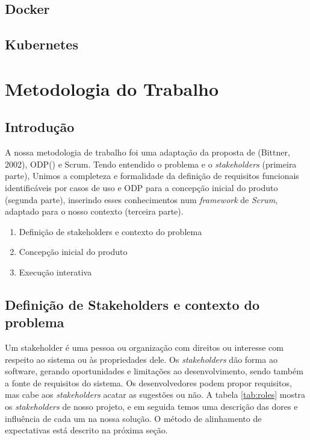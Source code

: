 \documentclass[twosideprint]{politex}
\begin{document}
	\section{Docker}
	\section{Kubernetes}
	

\chapter{Metodologia do Trabalho}
\section{Introdução}
A nossa metodologia de trabalho foi uma adaptação da proposta de (Bittner, 2002)\cite{usecases}, ODP() e Scrum\cite{essentialscrum}. Tendo entendido o problema e o \textit{stakeholders} (primeira parte), Unimos a completeza e formalidade da definição de requisitos funcionais identificáveis por casos de uso e ODP para a concepção inicial do produto (segunda parte), inserindo esses conhecimentos num \textit{framework} de \textit{Scrum}, adaptado para o nosso contexto (terceira parte).
\begin{enumerate}
    \item Definição de stakeholders e contexto do problema
    \item Concepção inicial do produto
    \item Execução interativa
\end{enumerate}

\section{Definição de Stakeholders e contexto do problema}
Um stakeholder é uma pessoa ou organização com direitos ou interesse com respeito ao sistema ou às propriedades dele. Os \textit{stakeholders} dão forma ao software, gerando oportunidades e limitações ao desenvolvimento, sendo também a fonte de requisitos do sistema. Os desenvolvedores podem propor requisitos, mas cabe aos \textit{stakeholders} acatar as sugestões ou não.
A tabela \ref{tab:roles} mostra os \textit{stakeholders} de nosso projeto, e em seguida temos uma descrição das dores e influência de cada um na nossa solução. O método de alinhamento de expectativas está descrito na próxima seção.
\end{document}
